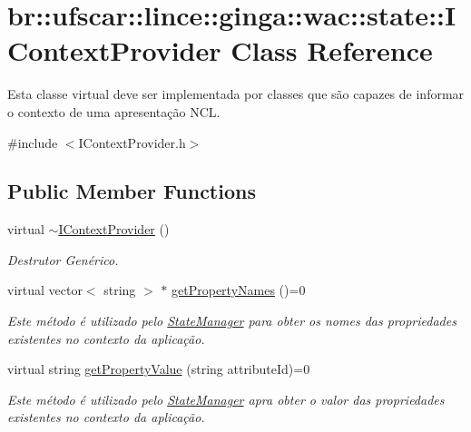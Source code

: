 \hypertarget{classbr_1_1ufscar_1_1lince_1_1ginga_1_1wac_1_1state_1_1IContextProvider}{
\section{br::ufscar::lince::ginga::wac::state::IContextProvider Class Reference}
\label{classbr_1_1ufscar_1_1lince_1_1ginga_1_1wac_1_1state_1_1IContextProvider}
}


Esta classe virtual deve ser implementada por classes que são capazes de informar o contexto de uma apresentação NCL.  




{\ttfamily \#include $<$IContextProvider.h$>$}

\subsection*{Public Member Functions}
\begin{DoxyCompactItemize}
\item 
virtual \hyperlink{classbr_1_1ufscar_1_1lince_1_1ginga_1_1wac_1_1state_1_1IContextProvider_a586f6b390cf22fb589aa3b6fb661dc49}{$\sim$IContextProvider} ()
\begin{DoxyCompactList}\small\item\em Destrutor Genérico. \item\end{DoxyCompactList}\item 
virtual vector$<$ string $>$ $\ast$ \hyperlink{classbr_1_1ufscar_1_1lince_1_1ginga_1_1wac_1_1state_1_1IContextProvider_a1912620e1f978f7e12dba01b0c31af5c}{getPropertyNames} ()=0
\begin{DoxyCompactList}\small\item\em Este método é utilizado pelo \hyperlink{classbr_1_1ufscar_1_1lince_1_1ginga_1_1wac_1_1state_1_1StateManager}{StateManager} para obter os nomes das propriedades existentes no contexto da aplicação. \item\end{DoxyCompactList}\item 
virtual string \hyperlink{classbr_1_1ufscar_1_1lince_1_1ginga_1_1wac_1_1state_1_1IContextProvider_a0777035084d9b444f13b85b71cda6927}{getPropertyValue} (string attributeId)=0
\begin{DoxyCompactList}\small\item\em Este método é utilizado pelo \hyperlink{classbr_1_1ufscar_1_1lince_1_1ginga_1_1wac_1_1state_1_1StateManager}{StateManager} apra obter o valor das propriedades existentes no contexto da aplicação. \item\end{DoxyCompactList}\end{DoxyCompactItemize}


